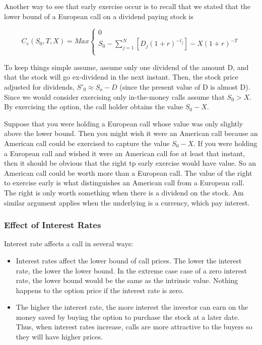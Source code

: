 \documentclass{book}
\theoremstyle{definition}
\theoremstyle{remark}
\begin{document}
            Another way to see that early exercise occur is to recall that we stated that the lower bound of a European call on a dividend paying stock is 
        
                \begin{equation*}
                    C_e(S_0, T, X) = Max
                         \begin{cases}
                            0 \\
                            S_0 - \sum_{j=1}^N \left [ D_j (1 + r)^{-t_j} \right] - X(1+r)^{-T} \\
                        \end{cases}
                \end{equation*}
                
            To keep things simple assume, assume only one dividend of the amount D, and that the stock will go ex-dividend in the next instant. Then, the stock price adjusted for dividends, $S'_0 \approx S_o - D$ (since the present value of D is almost D). Since we would consider exercising only in-the-money calls assume that $S_0 > X$. By exercising the option, the call holder obtains the value $S_0 - X$.
            
            Suppose that you were holding a European call whose value was only slightly above the lower bound. Then you might wish it were an American call because an American call could be exercised to capture the value $S_0 - X$. If you were holding a European call and wished it were an American call foe at least that instant,  then it should be obvious that the right tp early exercise would have value. So an American call could be worth more than a European call. The value of the right to exercise early is what distinguishes an American call from a European call. The right is only worth something when there is a dividend on the stock. Am similar argument applies when the underlying is a currency, which pay interest. 
        
        \subsubsection{Effect of Interest Rates}
        
            Interest rate affects a call in several ways:
                \begin{itemize}
                    \item Interest rates affect the lower bound of call prices. The lower the interest rate, the lower the lower bound. In the extreme case case of a zero interest rate, the lower bound would be the same as the intrinsic value. Nothing happens to the option price if the interest rate is zero. 
                    \item The higher the interest rate, the more interest the investor can earn on the money saved by buying the option to purchase the stock at a later date. Thus, when interest rates increase, calls are more attractive to the buyers so they will have higher prices. 
                \end{itemize}
\end{document}
